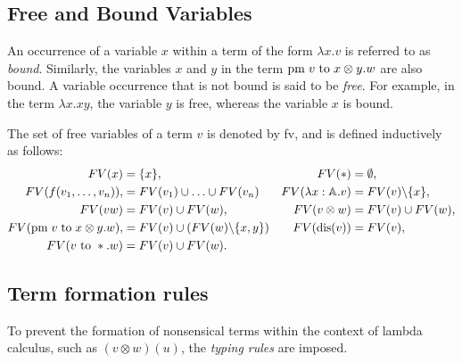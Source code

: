 
\subsection{Free and Bound Variables}
An occurrence of a variable $x$ within a term of the form $\lambda x.v$ is referred to as \emph{bound}.  Similarly, the variables $x$ and $y$ in the term $\text{pm} \hspace{3 pt} v \hspace{3 pt} \text{to} \hspace{3 pt} x \otimes y. w$ are also bound. A variable occurrence that is not bound is said to be \emph{free}. For example, in the term $\lambda x.xy$, the variable $y$ is free, whereas the variable $x$ is bound.  

The set of free variables of a term $v$ is denoted by \gls{fv}, and is defined inductively as follows:
\begin{equation*}
\begin{split}
FV(x) &= \{x\}, &  FV(*) &= \emptyset,  \\
FV(f(v_1, \ldots, v_n)), &= FV(v_1) \cup \ldots \cup FV(v_n)& FV(\lambda x: \mathbb{A}. v) &= FV(v) \backslash \{x\}, \\
FV(v w) &= FV(v) \cup FV(w), & FV(v \otimes w) &= FV(v) \cup FV(w), \\
FV(\text{pm} \hspace{3 pt} v \hspace{3 pt} \text{to} \hspace{3 pt} x \otimes y. w), &= FV(v) \cup (FV(w)  \backslash \{x,y\}) & FV(\text{dis}(v)) &= FV(v),\\
FV(v \text{ to } *.w) &= FV(v) \cup FV(w). \\
\end{split}
\end{equation*}


\subsection{Term formation rules}

To prevent the formation of nonsensical terms within the context of lambda calculus, such as $(v \otimes w) (u)$, the \emph{typing rules} are imposed.

